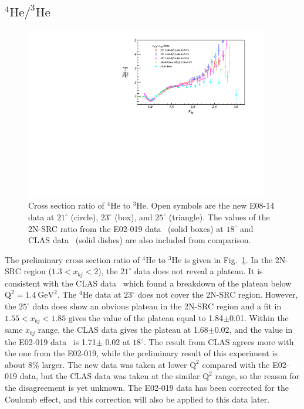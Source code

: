 \subsection{$\mathrm{^{4}He/^{3}He}$}
 \begin{figure}[!ht]
  \begin{center}
    \includegraphics[type=pdf,ext=.pdf,read=.pdf,width=0.95\textwidth]{./figures/xs/He4_He3_XS_Ratio_Zoom}
    \caption[Cross section ratio of $\mathrm{^{4}He}$ to $\mathrm{^{3}He}$]{\footnotesize{Cross section ratio of $\mathrm{^{4}He}$ to $\mathrm{^{3}He}$. Open symbols are the new E08-14 data at $21^{\circ}$ (circle), $23^{\circ}$ (box), and $25^{\circ}$ (triangle). The values of the 2N-SRC ratio from the E02-019 data~\cite{PhysRevLett.108.092502} (solid boxes) at $18^{\circ}$ and CLAS data~\cite{PhysRevLett.96.082501} (solid dishes) are also included from comparison.}}
    \label{ratio_he4_he3}
  \end{center}
\end{figure}
 The preliminary cross section ratio of $\mathrm{^{4}He}$ to $\mathrm{^{3}He}$ is given in Fig.~\ref{ratio_he4_he3}. In the 2N-SRC region ($1.3<x_{bj}<2$), the $21^{\circ}$ data does not reveal a plateau. It is consistent with the CLAS data~\cite{PhysRevLett.96.082501} which found a breakdown of the plateau below $\mathrm{Q^{2}=1.4~GeV^{2}}$. The $\mathrm{^{4}He}$ data at $23^{\circ}$ does not cover the 2N-SRC region. However, the $25^{\circ}$ data does show an obvious plateau in the 2N-SRC region and a fit in $1.55<x_{bj}<1.85$ gives the value of the plateau equal to 1.84$\pm$0.01. Within the same $x_{bj}$ range, the CLAS data gives the plateau at 1.68$\pm$0.02, and the value in the E02-019 data~\cite{PhysRevLett.108.092502} is 1.71$\pm$ 0.02 at $18^{\circ}$. The result from CLAS agrees more with the one from the E02-019, while the preliminary result of this experiment is about 8\% larger. The new data was taken at lower $\mathrm{Q^{2}}$ compared with the E02-019 data, but the CLAS data was taken at the similar $\mathrm{Q^{2}}$ range, so the reason for the disagreement is yet unknown. The E02-019 data has been corrected for the Coulomb effect, and this correction will also be applied to this data later.
 
